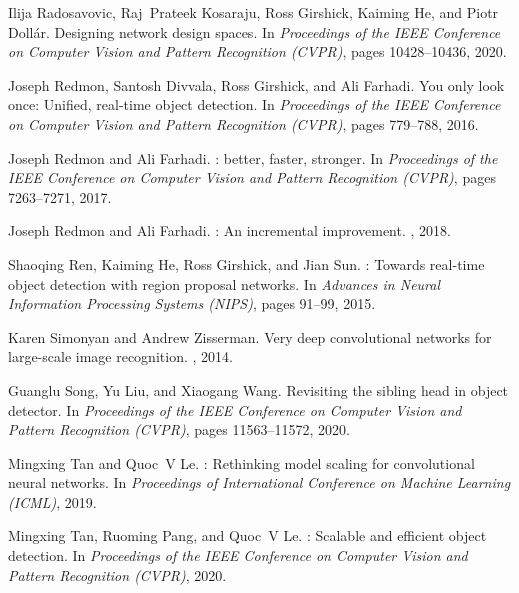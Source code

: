 \documentclass[10pt,twocolumn,letterpaper]{article}
\begin{document}
{\begin{thebibliography}{10}
	Ilija Radosavovic, Raj~Prateek Kosaraju, Ross Girshick, Kaiming He, and Piotr
	Doll{\'a}r.
	\newblock Designing network design spaces.
	\newblock In {\em Proceedings of the IEEE Conference on Computer Vision and
		Pattern Recognition (CVPR)}, pages 10428--10436, 2020.
	
	Joseph Redmon, Santosh Divvala, Ross Girshick, and Ali Farhadi.
	\newblock You only look once: Unified, real-time object detection.
	\newblock In {\em Proceedings of the IEEE Conference on Computer Vision and
		Pattern Recognition (CVPR)}, pages 779--788, 2016.
	
	Joseph Redmon and Ali Farhadi.
	: better, faster, stronger.
	\newblock In {\em Proceedings of the IEEE Conference on Computer Vision and
		Pattern Recognition (CVPR)}, pages 7263--7271, 2017.
	
	Joseph Redmon and Ali Farhadi.
	: An incremental improvement.
	, 2018.
	
	Shaoqing Ren, Kaiming He, Ross Girshick, and Jian Sun.
	: Towards real-time object detection with region
	proposal networks.
	\newblock In {\em Advances in Neural Information Processing Systems (NIPS)},
	pages 91--99, 2015.
	
	Karen Simonyan and Andrew Zisserman.
	\newblock Very deep convolutional networks for large-scale image recognition.
	, 2014.
	
	Guanglu Song, Yu Liu, and Xiaogang Wang.
	\newblock Revisiting the sibling head in object detector.
	\newblock In {\em Proceedings of the IEEE Conference on Computer Vision and
		Pattern Recognition (CVPR)}, pages 11563--11572, 2020.
	
	Mingxing Tan and Quoc~V Le.
	: Rethinking model scaling for convolutional neural
	networks.
	\newblock In {\em Proceedings of International Conference on Machine Learning
		(ICML)}, 2019.
	
	Mingxing Tan, Ruoming Pang, and Quoc~V Le.
	: Scalable and efficient object detection.
	\newblock In {\em Proceedings of the IEEE Conference on Computer Vision and
		Pattern Recognition (CVPR)}, 2020.
	

\end{thebibliography}}
\end{document}
